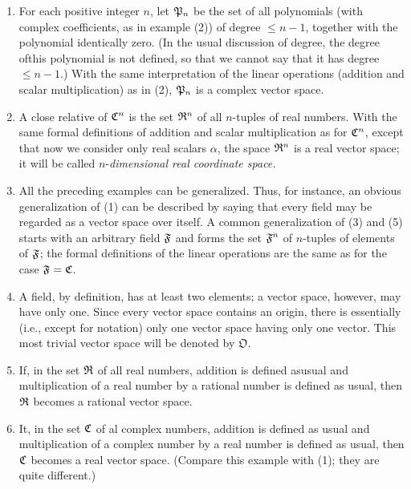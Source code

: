 \begin{enumerate}[label=(\arabic*), wide, nosep]
    \item For each positive integer \(n\), let \(\mathfrak{P}_n\) be the set of all
    polynomials (with complex coefficients, as in example (2)) of degree \(\leq
    n-1\), together with the polynomial identically zero. (In the usual
    discussion of degree, the degree ofthis polynomial is not defined, so that
    we cannot say that it has degree \(\leq n-1\).) With the same interpretation
    of the linear operations (addition and scalar multiplication) as in (2),
    \(\mathfrak{P}_n\) is a complex vector space.
    
    \item A close relative of \(\mathfrak{C}^n\) is the set \(\mathfrak{R}^n\) of all
    \(n\)-tuples of real numbers. With the same formal definitions of addition
    and scalar multiplication as for \(\mathfrak{C}^n\), except that now we consider
    only real scalars \(\alpha\), the space \(\mathfrak{R}^n\) is a real vector space;
    it will be called \(n\)-\emph{dimensional real coordinate space.}
    
    \item All the preceding examples can be generalized. Thus, for instance, an
    obvious generalization of (1) can be described by saying that every field
    may be regarded as a vector space over itself. A common generalization of
    (3) and (5) starts with an arbitrary field \(\mathfrak{F}\) and forms the set
    \(\mathfrak{F}^n\) of \(n\)-tuples of elements of \(\mathfrak{F}\); the formal
    definitions of the linear operations are the same as for the case \(\mathfrak{F} =
    \mathfrak{C}\).
    
    \item A field, by definition, has at least two elements; a vector space,
    however, may have only one. Since every vector space contains an origin,
    there is essentially (i.e., except for notation) only one vector space
    having only one vector. This most trivial vector space will be denoted by
    \(\mathfrak{O}\).
    
    \item If, in the set \(\mathfrak{R}\) of all real numbers, addition is defined
    asusual and multiplication of a real number by a rational number is defined
    as usual, then \(\mathfrak{R}\) becomes a rational vector space.
    
    \item It, in the set \(\mathfrak{C}\) of al complex numbers, addition is defined
    as usual and multiplication of a complex number by a real number is defined
    as usual, then \(\mathfrak{C}\) becomes a real vector space. (Compare this
    example with (1); they are quite different.)
\end{enumerate}

